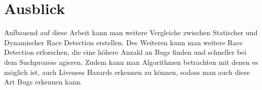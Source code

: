\section{Ausblick}


Aufbauend auf diese Arbeit kann man weitere Vergleiche zwischen Statischer und Dynamischer Race Detection erstellen. Des Weiteren kann man weitere Race Detection erforschen, die eine höhere Anzahl an Bugs finden und schneller bei dem Suchprozess agieren. Zudem kann man Algorithmen betrachten mit denen es möglich ist, auch Liveness Hazards erkennen zu können, sodass man auch diese Art Bugs erkennen kann.